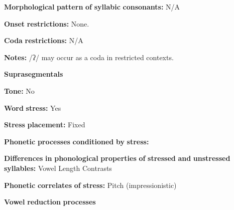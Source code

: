 \documentclass[output=paper]{langsci/langscibook}
\begin{document}
\begin{styleBody}
\textbf{Morphological} \textbf{pattern} \textbf{of} \textbf{syllabic} \textbf{consonants:} N/A
\end{styleBody}

\begin{styleBody}
\textbf{Onset} \textbf{restrictions:} None.
\end{styleBody}

\begin{styleBody}
\textbf{Coda} \textbf{restrictions:} N/A
\end{styleBody}

\begin{styleBody}
\textbf{Notes:} /ʔ/ may occur as a coda in restricted contexts.
\end{styleBody}

\begin{styleBody}
\textbf{Suprasegmentals}
\end{styleBody}

\begin{styleBody}
\textbf{Tone:} No
\end{styleBody}

\begin{styleBody}
\textbf{Word} \textbf{stress:} Yes
\end{styleBody}

\begin{styleBody}
\textbf{Stress} \textbf{placement:} Fixed
\end{styleBody}

\begin{styleBody}
\textbf{Phonetic} \textbf{processes} \textbf{conditioned} \textbf{by} \textbf{stress:}
\end{styleBody}

\begin{styleBody}
\textbf{Differences} \textbf{in} \textbf{phonological} \textbf{properties} \textbf{of} \textbf{stressed} \textbf{and} \textbf{unstressed} \textbf{syllables:} Vowel Length Contrasts
\end{styleBody}

\begin{styleBody}
\textbf{Phonetic} \textbf{correlates} \textbf{of} \textbf{stress:} Pitch (impressionistic)
\end{styleBody}

\begin{styleBody}
\textbf{Vowel} \textbf{reduction} \textbf{processes}
\end{styleBody}
\end{document}
